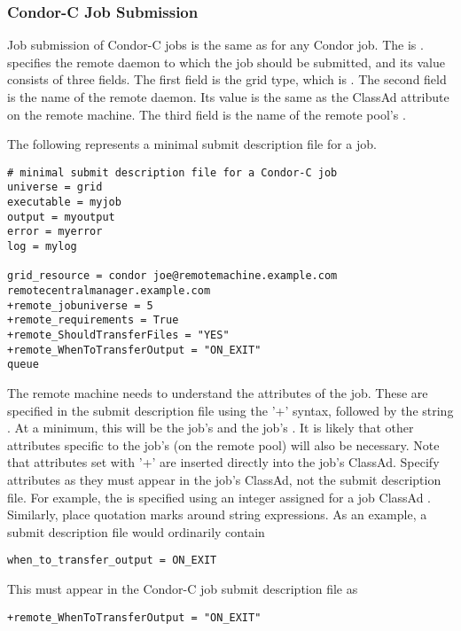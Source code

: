 \subsubsection{\label{sec:Condor-C-Submit}Condor-C Job Submission}
Job submission of Condor-C jobs is the same as for any Condor job.
The  is .
 specifies the remote  daemon to which
the job should be submitted, and its value consists of three fields.
The first field is the grid type, which is .
The second field is the name of the remote  daemon.
Its value is the
same as the  ClassAd attribute  on the
remote machine.
The third field is the name of the remote pool's .

The following represents a minimal submit description file for
a job.

\footnotesize
\begin{verbatim}
# minimal submit description file for a Condor-C job
universe = grid
executable = myjob
output = myoutput
error = myerror
log = mylog

grid_resource = condor joe@remotemachine.example.com remotecentralmanager.example.com
+remote_jobuniverse = 5
+remote_requirements = True
+remote_ShouldTransferFiles = "YES"
+remote_WhenToTransferOutput = "ON_EXIT"
queue
\end{verbatim}
\normalsize

The remote machine needs to understand the attributes of the job.
These are specified in the submit description file using the '+'
syntax, followed by the string .
At a minimum, this will be the job's  and the job's
.
It is likely that other attributes specific to the
job's  (on the remote pool) will also be necessary.
Note that attributes set with '+' are inserted directly into
the job's ClassAd.  
Specify attributes as they 
must appear in the job's ClassAd, not the submit description file. 
For example,
the  is specified using an integer assigned for
a job ClassAd .
Similarly, place quotation marks around string 
expressions.
As an example, a submit description file would ordinarily contain
\footnotesize
\begin{verbatim}
when_to_transfer_output = ON_EXIT
\end{verbatim}
\normalsize
This must appear in the Condor-C job submit description file as
\footnotesize
\begin{verbatim}
+remote_WhenToTransferOutput = "ON_EXIT"
\end{verbatim}
\normalsize

